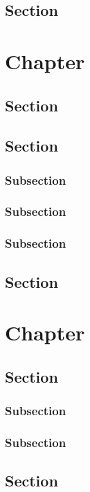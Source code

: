 \documentclass[a4paper,11pt,english]{report}
\begin{document}
\section{Section}

\chapter{Chapter}
\section{Section}

\section{Section}

\subsection{Subsection}

\subsection{Subsection}

\subsection{Subsection}

\section{Section}

\chapter{Chapter}

\section{Section}
\subsection{Subsection}

\subsection{Subsection}

\section{Section}
\end{document}
